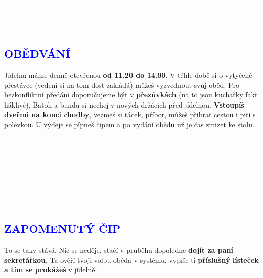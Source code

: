 \documentclass[a5paper, twoside]{article}
\newcommand{\boxik}[2]{
  \begin{tcolorbox}[
    sharp corners,
    colback = #1,
    boxrule = 0pt,
    grow to left by = 25pt,
    grow to right by = 25pt,
    right = 22pt,
    left = 22pt%
  ]
    #2
  \end{tcolorbox}
}
\newcommand{\polonadpis}[4]{
  \vspace*{-50pt}
  \begin{tcolorbox}[colback = #2, boxrule = 0pt, grow to left by = #4,  grow to right by = #4, arc=8pt, height = 30pt]
    \vspace*{5pt}
    \centering \subsection*{\textcolor{#3}{#1}}
  \end{tcolorbox}
}
\newcommand{\podnadpis}[2]{
  \subsection*{\textcolor{#2}{#1}}
}
\begin{document}
\smallskip

\boxik{blue}{ \textcolor{white}{\textbf{Pozor!} Na naší škole platí následující úsporné opatření. Stát normálně dotuje velkou část ceny oběda. Pokud si ho ale opakovaně koupíš a následně nevyzvedneš, budeš muset zaplatit plnou cenu!}}

\podnadpis{OBĚDVÁNÍ}{blue}
Jídelnu máme denně otevřenou \textbf{od 11.20 do 14.00}. V téhle době si o vytyčené přestávce (vedení si na tom dost zakládá) můžeš vyzvednout svůj oběd. Pro bezkonfliktní předání doporučujeme být v \textbf{přezůvkách} (na to jsou kuchařky fakt háklivé). Batoh a bundu si nechej v nových držácích před jídelnou. \textbf{Vstoupíš dveřmi na konci chodby}, vezmeš si tácek, příbor, můžeš přibrat cestou i pití s polévkou. U výdeje se pípneš čipem a po vydání obědu už je čas zmizet ke stolu.

\smallskip

\boxik{blue}{\textcolor{white}{\textbf{Náš tip.} V případě úplně nejhoršího scénáře, kdy si zapomeneš objednat jídlo a v burze nic není, můžeš zkusit dojít čtvrt hodiny před druhou a hodit na kuchařky psí oči, třeba ti něco dají. A i když se nevyvede s hlavním chodem, většinou ti dovolí vzít si polévku (ale od nás to nemáš!).}}

\pagebreak

\polonadpis{II. Formální záležitosti}{blue}{white}{-3.8cm}

\podnadpis{ZAPOMENUTÝ ČIP}{blue}
To se taky stává. Nic se neděje, stačí v průběhu dopoledne \textbf{dojít za paní
	sekretářkou}. Ta ověří tvoji volbu oběda v systému, vypíše ti \textbf{příslušný lísteček
	a tím se prokážeš} v jídelně.
\end{document}
